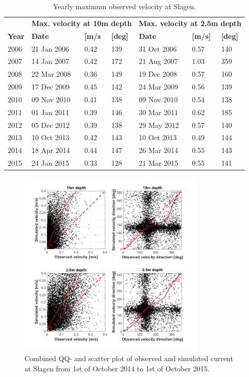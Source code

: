 \begin{table}[ht]
\caption{Yearly maximum observed velocity at Slagen.}
\label{tab:Slagen_max}
\centering
\begin{tabular}{|l|lll|lll|}
\hline 
& \multicolumn{3}{|l|}{\bf Max. velocity at 10m depth} & \multicolumn{3}{|l|}{\bf Max. velocity at 2.5m depth} \\
{\bf Year} & {\bf Date} & {\bf [m/s} & {\bf [deg]} & {\bf Date} & {\bf [m/s]} & {\bf [deg]} \\ \hline 
\small 2006 & 21 Jan 2006 & 0.42 & 139 & 31 Oct 2006 & 0.57 & 140 \\
\small 2007 & 14 Jan 2007 & 0.42 & 172 & 21 Aug 2007 & 1.03 & 359 \\
\small 2008 & 22 Mar 2008 & 0.36 & 149 & 19 Dec 2008 & 0.57 & 160 \\
\small 2009 & 17 Dec 2009 & 0.45 & 142 & 24 Mar 2009 & 0.56 & 139 \\
\small 2010 & 09 Nov 2010 & 0.41 & 138 & 09 Nov 2010 & 0.54 & 138 \\
\small 2011 & 01 Jan 2011 & 0.39 & 146 & 30 Mar 2011 & 0.62 & 185 \\
\small 2012 & 05 Dec 2012 & 0.39 & 138 & 29 May 2012 & 0.57 & 140 \\
\small 2013 & 10 Oct 2013 & 0.42 & 143 & 10 Oct 2013 & 0.49 & 144 \\
\small 2014 & 18 Apr 2014 & 0.44 & 147 & 26 Mar 2014 & 0.55 & 143 \\
\small 2015 & 24 Jan 2015 & 0.33 & 128 & 21 Mar 2015 & 0.55 & 141 \\
\hline
\end{tabular}
\end{table}

\begin{figure}[ht]
	\centerline{
		\includegraphics*[trim=0cm 0cm 0cm 0cm,clip=true,width=0.8\textwidth]{Figurer/Slagen_QQ} }
	\caption{\small Combined QQ- and scatter plot of observed and simulated current at Slagen from 1st of October 2014 to 1st of October 2015.}
	\label{fig:Slagen_QQ}
\end{figure}

